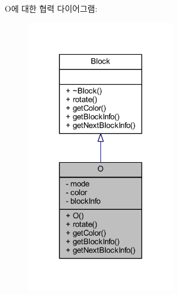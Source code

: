 O에 대한 협력 다이어그램\+:
\nopagebreak
\begin{figure}[H]
\begin{center}
\leavevmode
\includegraphics[width=185pt]{class_o__coll__graph}
\end{center}
\end{figure}
